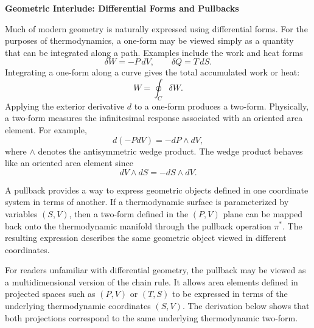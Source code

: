

\begin{geombox}
\textbf{Geometric Interlude: Differential Forms and Pullbacks}

Much of modern geometry is naturally expressed using differential forms. For the purposes of thermodynamics, a one-form may be viewed simply as a quantity that can be integrated along a path. Examples include the work and heat forms
\[
\delta W=-P\,dV,
\qquad
\delta Q=T\,dS .
\]
Integrating a one-form along a curve gives the total accumulated work or heat:
\[
W=\oint_C \delta W .
\]
Applying the exterior derivative \(d\) to a one-form produces a two-form. Physically, a two-form measures the infinitesimal response associated with an oriented area element. For example,
\[
d(-PdV)
=
-dP\wedge dV ,
\]
where \(\wedge\) denotes the antisymmetric wedge product. The wedge product behaves like an oriented area element since
\[
dV\wedge dS
=
-dS\wedge dV .
\]

A pullback provides a way to express geometric objects defined in one coordinate system in terms of another. If a thermodynamic surface is parameterized by variables \((S,V)\), then a two-form defined in the \((P,V)\) plane can be mapped back onto the thermodynamic manifold through the pullback operation \(\pi^*\). The resulting expression describes the same geometric object viewed in different coordinates.

For readers unfamiliar with differential geometry, the pullback may be viewed as a multidimensional version of the chain rule. It allows area elements defined in projected spaces such as \((P,V)\) or \((T,S)\) to be expressed in terms of the underlying thermodynamic coordinates \((S,V)\). The derivation below shows that both projections correspond to the same underlying thermodynamic two-form.

\end{geombox}